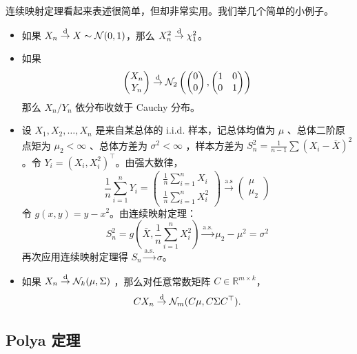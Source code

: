 连续映射定理看起来表述很简单，但却非常实用。我们举几个简单的小例子。

\begin{example}[连续映射定理的简单应用]

\begin{itemize}
\tightlist
\item
  如果 $X_n \overset{\rm d}\to X \sim\mathcal N(0, 1)$，那么 $X_n^2 \overset{\rm d}\to \chi_1^2$。
\item
  如果 
  \[  \begin{pmatrix} X_n \\ Y_n \end{pmatrix} \overset{\rm d}\to \mathcal N_2\left(\begin{pmatrix} 0 \\ 0 \end{pmatrix}, \begin{pmatrix} 1 &0\\ 0&1 \end{pmatrix}\right)
  \]  那么 $X_n / Y_n$ 依分布收敛于 Cauchy 分布。%
\item
  设 $X_1,X_2,\dots,X_n$ 是来自某总体的 i.i.d. 样本，记总体均值为 $\mu$ 、总体二阶原点矩为 $\mu_2<\infty$ 、总体方差为 $\sigma^2<\infty$ ，样本方差为 $S_n^2 = \frac{1}{n-1}\sum (X_i - \bar{X})^2$。令 $Y_i = (X_i, X_i^2)^\top$。由强大数律， 
  \[  \frac{1}{n}\sum_{i=1}^{n} Y_i = \begin{pmatrix} \frac{1}{n}\sum_{i=1}^{n} X_i \\ \frac{1}{n}\sum_{i=1}^{n} X_i^2 \end{pmatrix} \overset{\text{a.s}}\to \begin{pmatrix} \mu \\ \mu_2 \end{pmatrix}
  \]  令 $g(x, y) = y - x^2$。由连续映射定理： 
  \[  S_n^2 = g\left(\bar{X}, \frac{1}{n}\sum_{i=1}^{n} X_i^2\right) \overset{\text{a.s.}}\to \mu_2 - \mu^2 = \sigma^2
  \]  再次应用连续映射定理得 $S_n \overset{\text{a.s.}}\to \sigma$。
\item
  如果 $X_n \overset{\rm d}\to \mathcal N_k(\mu, \Sigma)$ ，那么对任意常数矩阵 $C \in \mathbb{R}^{m \times k}$， 
  \[  C X_n \overset{\rm d}\to \mathcal N_m(C\mu, C\Sigma C^\top).
  \]\end{itemize}

\end{example}

\subsection{Polya 定理}

